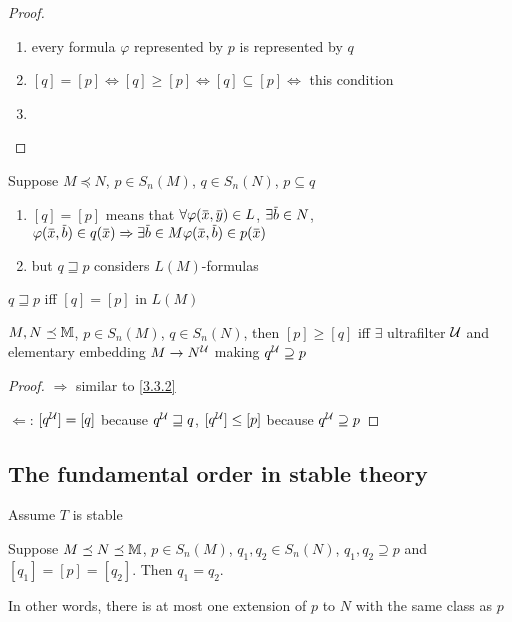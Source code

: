 \documentclass[11pt]{article}
\begin{document}
\begin{proof}
\begin{enumerate}
\item every formula \(\varphi\) represented by \(p\) is represented by \(q\)
\item \([q]=[p]\Leftrightarrow[q]\ge[p]\Leftrightarrow[q]\subseteq[p]\Leftrightarrow\) this condition
\item 
\end{enumerate}
\end{proof}

\begin{remark}
Suppose \(M\preceq N\), \(p\in S_n(M)\), \(q\in S_n(N)\), \(p\subseteq q\)
\begin{enumerate}
\item \([q]=[p]\)  means
that
\(\forall\varphi(\barx,\bary)\in L\),
\(\exists\barb\in N\), \(\varphi(\barx,\barb)\in q(\barx)\Rightarrow \exists\barb\in M\varphi(\barx,\barb)\in p(\barx)\)
\item but \(q\sqsupseteq p\) considers \(L(M)\)-formulas
\end{enumerate}


\(q\sqsupseteq p\) iff \([q]=[p]\) in \(L(M)\)
\end{remark}

\begin{proposition}[]
\(M,N\preceq\mathbb{M}\), \(p\in S_n(M)\), \(q\in S_n(N)\), then \([p]\ge[q]\) iff \(\exists\) ultrafilter \(\mathcal{U}\) and
elementary embedding \(M\to N^{\mathcal{U}}\) making \(q^{\mathcal{U}}\supseteq p\)
\end{proposition}

\begin{proof}
\(\Rightarrow\) similar to \ref{3.3.2}

\(\Leftarrow\): \([q^{\mathcal{U}}]=[q]\) because \(q^{\mathcal{U}}\sqsupseteq q\), \([q^{\mathcal{U}}]\le[p]\) because \(q^{\mathcal{U}}\supseteq p\)
\end{proof}
\subsection{The fundamental order in stable theory}
\label{sec:org3d7480b}
Assume \(T\) is stable
\begin{lemma}[]
\label{3.31.8}
Suppose \(M\preceq N\preceq\mathbb{M}\), \(p\in S_n(M)\), \(q_1,q_2\in S_n(N)\), \(q_1,q_2\supseteq p\) and \([q_1]=[p]=[q_2]\).
Then \(q_1=q_2\).

In other words, there is at most one extension of \(p\) to \(N\) with the same class as \(p\)
\end{lemma}
\end{document}
